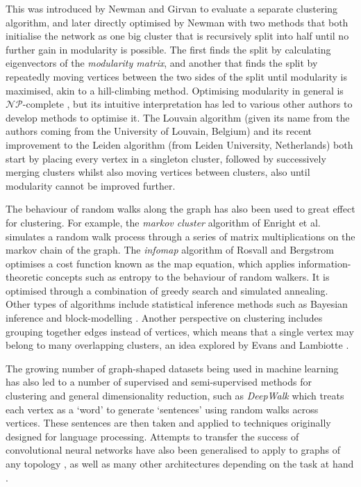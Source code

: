 This was introduced by Newman and Girvan \cite{Newman2004} to evaluate a separate clustering algorithm, and later directly optimised by Newman \cite{Newman2006Modularity} with two methods that both initialise the network as one big cluster that is recursively split into half until no further gain in modularity is possible. The first finds the split by calculating eigenvectors of the \emph{modularity matrix}, and another that finds the split by repeatedly moving vertices between the two sides of the split until modularity is maximised, akin to a hill-climbing method.
Optimising modularity in general is $\mathcal{NP}$-complete \cite{Brandes2007Modularity}, but its intuitive interpretation has led to various other authors to develop methods to optimise it. The Louvain algorithm (given its name from the authors coming from the University of Louvain, Belgium) \cite{Blondel2008} and its recent improvement to the Leiden algorithm (from Leiden University, Netherlands) \cite{Traag2019} both start by placing every vertex in a singleton cluster, followed by successively merging clusters whilst also moving vertices between clusters, also until modularity cannot be improved further.

The behaviour of random walks along the graph has also been used to great effect for clustering. For example, the \emph{markov cluster} algorithm of Enright et al.\ \cite{Enright2002} simulates a random walk process through a series of matrix multiplications on the markov chain of the graph.
The \emph{infomap} algorithm of Rosvall and Bergstrom \cite{Rosvall2008} optimises a cost function known as the map equation, which applies information-theoretic concepts such as entropy to the behaviour of random walkers. It is optimised through a combination of greedy search and simulated annealing.
Other types of algorithms include statistical inference methods such as Bayesian inference \cite{Hastings2006} and block-modelling \cite{Reichardt2007}.
Another perspective on clustering includes grouping together edges instead of vertices, which means that a single vertex may belong to many overlapping clusters, an idea explored by Evans and Lambiotte \cite{Evans2009}.

The growing number of graph-shaped datasets being used in machine learning has also led to a number of supervised and semi-supervised methods for clustering and general dimensionality reduction, such as \emph{DeepWalk} \cite{Perozzi2014} which treats each vertex as a `word' to generate `sentences' using random walks across vertices. These sentences are then taken and applied to techniques originally designed for language processing. Attempts to transfer the success of convolutional neural networks have also been generalised to apply to graphs of any topology \cite{Kipf2016, LeCun2017}, as well as many other architectures depending on the task at hand \cite{Battaglia2018, Wu2020}.

